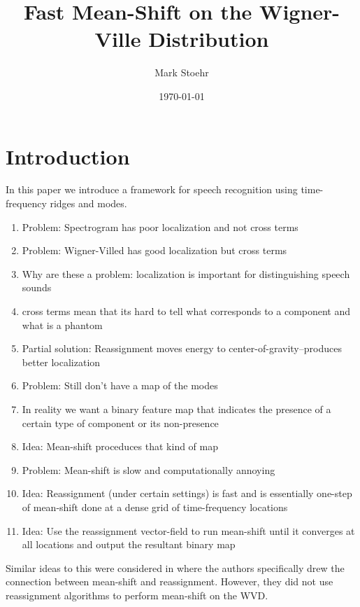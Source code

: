 \documentclass[english]{article}
\title{Fast Mean-Shift on the Wigner-Ville Distribution}
\author{Mark Stoehr}
\date{\today}
\begin{document}
\maketitle
\tableofcontents

\section{Introduction}

In this paper we introduce a framework for speech recognition using
time-frequency ridges and modes.  
\begin{enumerate}
\item Problem: Spectrogram has poor localization and not cross terms
\item Problem: Wigner-Villed has good localization but cross terms
\item Why are these a problem: localization is important for distinguishing speech sounds
\item cross terms mean that its hard to tell what corresponds to a component and what is a phantom
\item Partial solution: Reassignment moves energy to center-of-gravity--produces better localization
\item Problem: Still don't have a map of the modes
\item In reality we want a binary feature map that indicates the presence of a certain type of component or its non-presence
\item Idea: Mean-shift proceduces that kind of map
\item Problem: Mean-shift is slow and computationally annoying
\item Idea: Reassignment (under certain settings) is fast and is essentially one-step of mean-shift done at a dense grid of time-frequency locations
\item Idea: Use the reassignment vector-field to run mean-shift until it converges at all locations and output the resultant binary map
\end{enumerate}

Similar ideas to this were considered in \cite{tfsnakes,ozertem11} where the authors specifically drew the connection
between mean-shift and reassignment. However, they did not use reassignment algorithms to perform mean-shift on the WVD.
\end{document}
